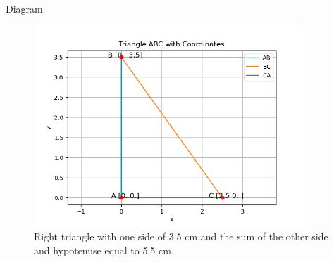 \documentclass{beamer}
\begin{document}
\begin{frame}{Diagram}
    \begin{figure}[h!]
        \centering
        \includegraphics[width=0.9\textwidth]{fig.png} %
        \caption{Right triangle with one side of 3.5 cm and the sum of the other side and hypotenuse equal to 5.5 cm.}
    \end{figure}
\end{frame}
\end{document}
